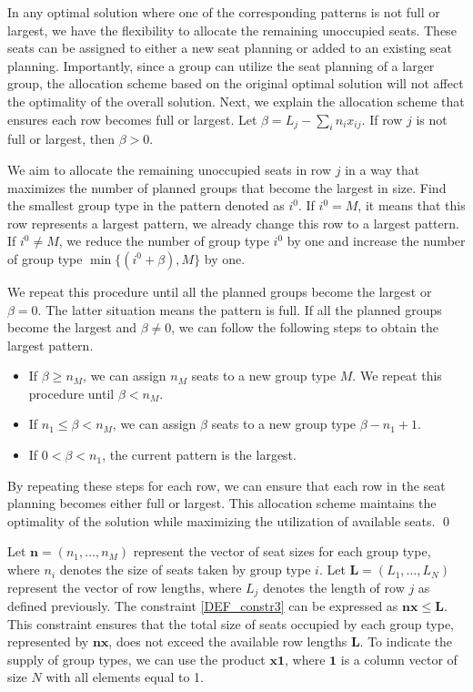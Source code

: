 \begin{pf}
In any optimal solution where one of the corresponding patterns is not full or largest, we have the flexibility to allocate the remaining unoccupied seats. These seats can be assigned to either a new seat planning or added to an existing seat planning. Importantly, since a group can utilize the seat planning of a larger group, the allocation scheme based on the original optimal solution will not affect the optimality of the overall solution. Next, we explain the allocation scheme that ensures each row becomes full or largest. Let $\beta= L_{j} - \sum_{i} n_{i} x_{ij}$. If row $j$ is not full or largest, then $\beta > 0$. 

We aim to allocate the remaining unoccupied seats in row $j$ in a way that maximizes the number of planned groups that become the largest in size.
Find the smallest group type in the pattern denoted as $i^0$. If $i^0 = M$, it means that this row represents a largest pattern, we already change this row to a largest pattern. If $i^0 \neq M$, we reduce the number of group type $i^0$ by one and increase the number of group type $\min \{(i^0+\beta), M\}$ by one. 

We repeat this procedure until all the planned groups become the largest or $\beta = 0$. The latter situation means the pattern is full. If all the planned groups become the largest and $\beta \neq 0$, we can follow the following steps to obtain the largest pattern.

\begin{itemize}
  \item If $\beta \geq n_{M}$, we can assign $n_M$ seats to a new group type $M$. We repeat this procedure until $\beta < n_{M}$. 
  \item If $n_{1} \leq \beta < n_{M}$, we can assign $\beta$ seats to a new group type $\beta-n_{1}+1$.
  \item If $0 < \beta < n_{1}$, the current pattern is the largest.
\end{itemize}

By repeating these steps for each row, we can ensure that each row in the seat planning becomes either full or largest. This allocation scheme maintains the optimality of the solution while maximizing the utilization of available seats. \qed
\end{pf}

Let $\mathbf{n} = (n_1, \ldots, n_M)$ represent the vector of seat sizes for each group type, where $n_i$ denotes the size of seats taken by group type $i$. Let $\mathbf{L} = (L_1, \ldots, L_N)$ represent the vector of row lengths, where $L_j$ denotes the length of row $j$ as defined previously.
The constraint \eqref{DEF_constr3} can be expressed as $\mathbf{n} \mathbf{x} \leq \mathbf{L}$. This constraint ensures that the total size of seats occupied by each group type, represented by $\mathbf{n} \mathbf{x}$, does not exceed the available row lengths $\mathbf{L}$.
To indicate the supply of group types, we can use the product $\mathbf{x} \mathbf{1}$, where $\mathbf{1}$ is a column vector of size $N$ with all elements equal to 1. 


